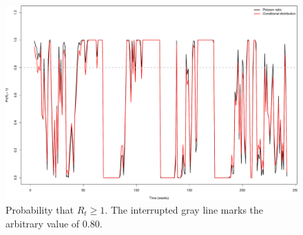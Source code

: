 \documentclass[12pt]{article}
\begin{document}
\begin{figure}[!h]
\begin{center}
\includegraphics{FIGURES/figure-004}
\end{center}
\caption{Probability that $R_t \geq 1$.
The interrupted gray line marks the arbitrary value of $0.80$.  
}
\label{fig:pRt1}
\end{figure}
\newpage

\end{document}
